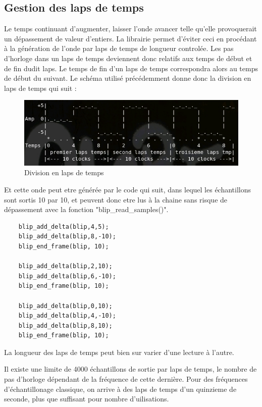 \documentclass[french]{report}
\begin{document}
\subsection{Gestion des laps de temps}
Le temps continuant d'augmenter, laisser l'onde avancer telle qu'elle provoquerait un dépassement de valeur d'entiers. 
La librairie permet d'éviter ceci en procédant à la génération de l'onde par laps de temps de longueur controlée.
Les pas d'horloge dans un laps de temps deviennent donc relatifs aux temps de début et de fin dudit laps.
Le temps de fin d'un laps de temps correspondra alors au temps de début du suivant.
Le schéma utilisé précédemment donne donc la division en laps de temps qui suit :

\begin{figure}[h]
\centering
\includegraphics[scale=0.5]{images/Wave3.jpg}
\caption{Division en laps de temps}
\label{WAV3}
\end{figure}

Et cette onde peut etre générée par le code qui suit, dans lequel les échantillons sont sortis 10 par 10, et peuvent donc etre lus à la chaine sans risque de dépassement avec la fonction "blip\_read\_samples()".

\begin{lstlisting}
	blip_add_delta(blip,4,5);
	blip_add_delta(blip,8,-10);
	blip_end_frame(blip, 10);
	
	blip_add_delta(blip,2,10);
	blip_add_delta(blip,6,-10);
	blip_end_frame(blip, 10);
	
	blip_add_delta(blip,0,10);
	blip_add_delta(blip,4,-10);
	blip_add_delta(blip,8,10);
	blip_end_frame(blip, 10);
\end{lstlisting}

La longueur des laps de temps peut bien sur varier d'une lecture à l'autre.

Il existe une limite de 4000 échantillons de sortie par laps de temps, le nombre de pas d'horloge dépendant de la fréquence de cette dernière.
Pour des fréquences d'échantillonage classique, on arrive à des laps de temps d'un quinzieme de seconde, plus que suffisant pour nombre d'uilisations.
\end{document}
